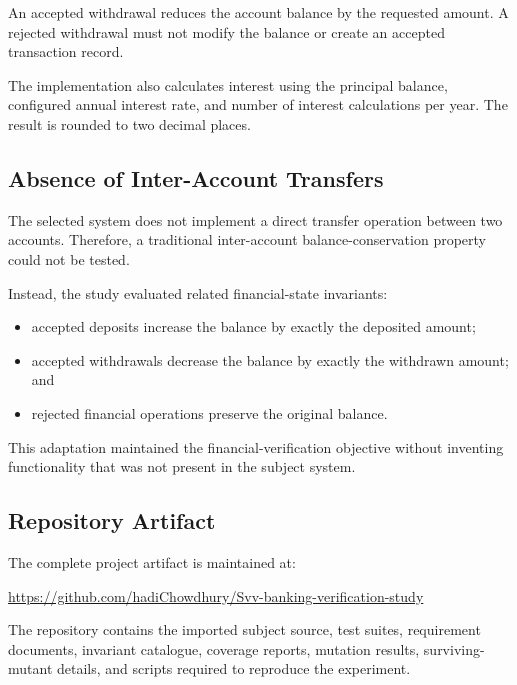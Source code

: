 \documentclass[12pt]{article}
\begin{document}
An accepted withdrawal reduces the account balance by the requested amount.
A rejected withdrawal must not modify the balance or create an accepted
transaction record.

The implementation also calculates interest using the principal balance,
configured annual interest rate, and number of interest calculations per year.
The result is rounded to two decimal places.

\subsection{Absence of Inter-Account Transfers}

The selected system does not implement a direct transfer operation between two
accounts. Therefore, a traditional inter-account balance-conservation
property could not be tested.

Instead, the study evaluated related financial-state invariants:

\begin{itemize}
    \item accepted deposits increase the balance by exactly the deposited
          amount;
    \item accepted withdrawals decrease the balance by exactly the withdrawn
          amount; and
    \item rejected financial operations preserve the original balance.
\end{itemize}

This adaptation maintained the financial-verification objective without
inventing functionality that was not present in the subject system.

\subsection{Repository Artifact}

The complete project artifact is maintained at:

\begin{center}
\url{https://github.com/hadiChowdhury/Svv-banking-verification-study}
\end{center}

The repository contains the imported subject source, test suites, requirement
documents, invariant catalogue, coverage reports, mutation results,
surviving-mutant details, and scripts required to reproduce the experiment.

\end{document}
